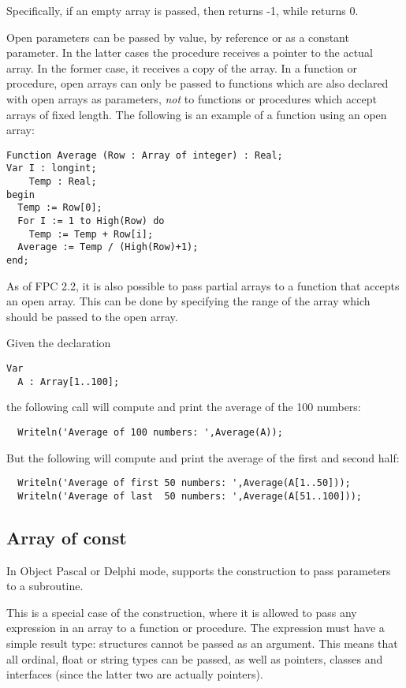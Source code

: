 Specifically, if an empty array is passed, then  returns -1, 
while  returns 0.

Open parameters can be passed by value, by reference or as a constant
parameter. In the latter cases the procedure receives a pointer to the
actual array. In the former case, it receives a copy of the array.
In a function or procedure, open arrays can only be passed to functions which
are also declared with open arrays as parameters, {\em not} to functions or
procedures which accept arrays of fixed length.
The following is an example of a function using an open array:
\begin{verbatim}
Function Average (Row : Array of integer) : Real;
Var I : longint;
    Temp : Real;
begin
  Temp := Row[0];
  For I := 1 to High(Row) do
    Temp := Temp + Row[i];
  Average := Temp / (High(Row)+1);
end;
\end{verbatim}

As of FPC 2.2, it is also possible to pass partial arrays to a function that
accepts an open array. This can be done by specifying the range of the array
which should be passed to the open array.

Given the declaration
\begin{verbatim}
Var
  A : Array[1..100];
\end{verbatim}
the following call will compute and print the average of the 100 numbers:
\begin{verbatim}
  Writeln('Average of 100 numbers: ',Average(A));
\end{verbatim}
But the following will compute and print the average of the first and second
half:
\begin{verbatim}
  Writeln('Average of first 50 numbers: ',Average(A[1..50]));
  Writeln('Average of last  50 numbers: ',Average(A[51..100]));
\end{verbatim} 

\subsection{Array of const}
In Object Pascal or Delphi mode, \fpc supports the 
construction to pass parameters to a subroutine.

This is a special case of the  construction, where it is
allowed to pass any expression in an array to a function or procedure. 
The expression must have a simple result type: structures cannot be passed
as an argument. This means that all ordinal, float or string types can be
passed, as well as pointers, classes and interfaces (since the latter two
are actually pointers).

